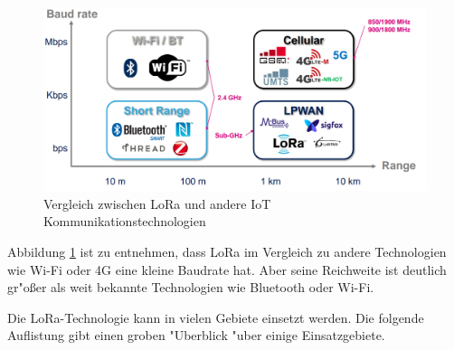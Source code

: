 \begin{figure}[h]
	\centering
	\includegraphics[width=14cm]{source/images/Communications_tech}
	\caption{Vergleich zwischen LoRa und andere IoT 
	Kommunikationstechnologien \cite{LoRaWAN}\label{fig:Netz}}
\end{figure}
Abbildung \ref{fig:Netz} ist zu entnehmen, dass LoRa im Vergleich zu 
andere Technologien wie Wi-Fi oder 4G eine kleine Baudrate hat. Aber 
seine Reichweite ist deutlich gr"o\ss{}er als weit bekannte 
Technologien wie Bluetooth oder Wi-Fi.

Die LoRa-Technologie kann in vielen Gebiete einsetzt werden. Die folgende 
Auflistung gibt einen groben "Uberblick "uber einige Einsatzgebiete.

